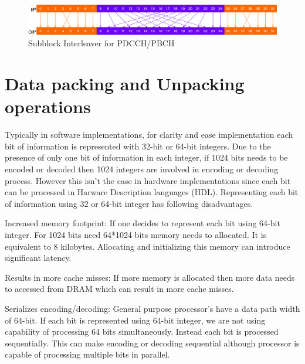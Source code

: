 \begin{figure}[h]
	\centering
	\includegraphics[width=1\textwidth]{./figures/subblockInterleaver.pdf}
	\caption{Subblock Interleaver for PDCCH/PBCH}
	\label{fig:subblockInterleaver}
\end{figure}

\section{Data packing and Unpacking operations} \label{dataPackUnpack}
Typically in software implementations, for clarity and ease implementation each bit of information is represented with 32-bit or 64-bit integers. Due to the presence of only one bit of information in each integer, if 1024 bits needs to be encoded or decoded then 1024 integers are involved in encoding or decoding process. However this isn't the case in hardware implementations since each bit can be processed in Harware Description languages (HDL). Representing each bit of information using 32 or 64-bit integer has following disadvantages.

\begin{description}[font=$\bullet$~\normalfont]
	\item Increased memory footprint: If one decides to represent each bit using 64-bit integer. For 1024 bits need 64*1024 bits memory needs to allocated. It is equivalent to 8 kilobytes. Allocating and initializing this memory can introduce significant latency.
	\item Results in more cache misses: If more memory is allocated then more data needs to accessed from DRAM which can result in more cache misses.
	\item Serializes encoding/decoding: General purpose processor's have a data path width of 64-bit. If each bit is represented using 64-bit integer, we are not using capability of processing 64 bits simultaneously. Instead each bit is processed sequentially. This can make encoding or decoding sequential although processor is capable of processing multiple bits in parallel.
\end{description}

